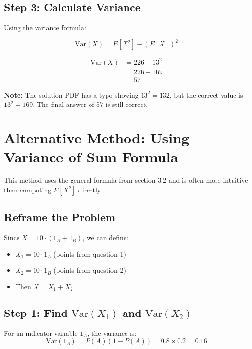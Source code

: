 \documentclass[11pt]{article}
\begin{document}
\subsection{Step 3: Calculate Variance}

Using the variance formula:
\begin{tcolorbox}[colback=red!5!white,colframe=red!75!black,title=Variance Formula]
\begin{equation}
\text{Var}(X) = E[X^2] - (E[X])^2
\end{equation}
\end{tcolorbox}

\begin{align}
\text{Var}(X) &= 226 - 13^2\\
&= 226 - 169\\
&= 57
\end{align}

\textbf{Note:} The solution PDF has a typo showing $13^2 = 132$, but the correct value is $13^2 = 169$. The final answer of 57 is still correct.

\section{Alternative Method: Using Variance of Sum Formula}

This method uses the general formula from section 3.2 and is often more intuitive than computing $E[X^2]$ directly.

\subsection{Reframe the Problem}

Since $X = 10 \cdot (1_A + 1_B)$, we can define:
\begin{itemize}
    \item $X_1 = 10 \cdot 1_A$ (points from question 1)
    \item $X_2 = 10 \cdot 1_B$ (points from question 2)
    \item Then $X = X_1 + X_2$
\end{itemize}

\subsection{Step 1: Find $\text{Var}(X_1)$ and $\text{Var}(X_2)$}

For an indicator variable $1_A$, the variance is:
\begin{equation}
\text{Var}(1_A) = P(A)(1 - P(A)) = 0.8 \times 0.2 = 0.16
\end{equation}
\end{document}
